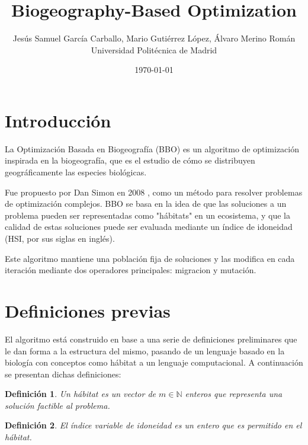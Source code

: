 \documentclass{article}
\newtheorem{mydef}{Definición}
\begin{document}
\title{Biogeography-Based Optimization}

\author{{Jesús Samuel García Carballo,
Mario Gutiérrez López,
Álvaro Merino Román} \\
{\small Universidad Politécnica de Madrid}}
\date{\today}

\maketitle

\newpage

\section{Introducción}
\label{sec:meta1_intro}

La Optimización Basada en Biogeografía (BBO) es un algoritmo de optimización inspirada en la biogeografía, que es el estudio de cómo se distribuyen geográficamente las especies biológicas.

Fue propuesto por Dan Simon en 2008 \cite{simon2008biogeography}, como un método para resolver problemas de optimización complejos. 
BBO se basa en la idea de que las soluciones a un problema pueden ser representadas como "hábitats" en un ecosistema, y que la calidad de estas soluciones puede ser evaluada mediante un índice de idoneidad (HSI, por sus siglas en inglés).

Este algoritmo mantiene una población fija de soluciones y las modifica en cada iteración mediante dos operadores principales: migracion y mutación.

\section{Definiciones previas}
\label{sec:meta1_algoritmo}

El algoritmo está construido en base a una serie de definiciones preliminares que le dan forma a la estructura del mismo, pasando de un lenguaje
basado en la biología con conceptos como hábitat a un lenguaje computacional. 
A continuación se presentan dichas definiciones:

\begin{mydef}
    Un hábitat es un vector de $m \in \mathbb{N}$ enteros que representa una solución factible al problema.
\end{mydef}

\begin{mydef}
    El índice variable de idoneidad es un entero que es permitido en el hábitat. 
\end{mydef}
\end{document}
